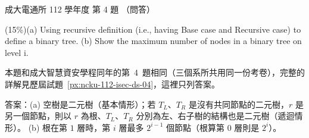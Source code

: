 \begin{pastexam}[label={px:ncku-112-cce-ds-04}]{成大電通所 112 學年度 第 4 題}
（問答）

(15\%)(a) Using recursive definition (i.e., having Base case and Recursive case) to define a
binary tree. (b) Show the maximum number of nodes in a binary tree on level i.
\end{pastexam}

\begin{pastsoln}
本題和成大智慧資安學程同年的第~4~題相同（三個系所共用同一份考卷），完整的詳解見歷屆試題~\ref{px:ncku-112-isec-ds-04}，這裡只列答案。

答案：(a) 空樹是二元樹（基本情形）；若 $T_L$、$T_R$ 是沒有共同節點的二元樹，$r$ 是另一個節點，則以 $r$ 為根、$T_L$、$T_R$
分別為左、右子樹的結構也是二元樹（遞迴情形）。 (b) 根在第 $1$ 層時，第 $i$ 層最多 $2^{i-1}$ 個節點（根算第 $0$ 層則是 $2^i$）。
\end{pastsoln}
